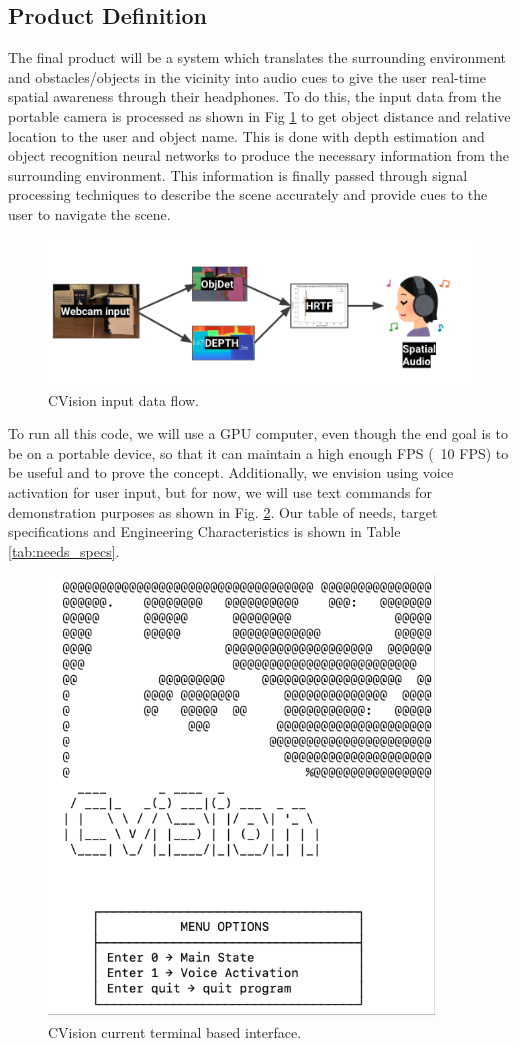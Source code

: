 \documentclass[12pt,a4paper]{article}
\begin{document}
\subsection{Product Definition}
The final product will be a system which translates the surrounding environment and obstacles/objects in the vicinity into audio cues to give the user real-time spatial awareness through their headphones.
To do this, the input data from the portable camera is processed as shown in Fig \ref{data_flow} to get object distance and relative location to the user and object name.
This is done with depth estimation and object recognition neural networks to produce the necessary information from the surrounding environment.
This information is finally passed through signal processing techniques to describe the scene accurately and provide cues to the user to navigate the scene. 

\begin{figure}[ht!]
    \center
    \includegraphics[width=1\linewidth]{data_flow.png}
    \caption{CVision input data flow.}
    \label{data_flow}
  \end{figure}
\newpage
To run all this code, we will use a GPU computer, even though the end goal is to be on a portable device, so that it can maintain a high enough FPS (~10 FPS) to be useful and to prove the concept.
Additionally, we envision using voice activation for user input, but for now, we will use text commands for demonstration purposes as shown in Fig. \ref{gui}.
Our table of needs, target specifications and Engineering Characteristics is shown in Table \ref{tab:needs_specs}.

\begin{figure}[ht!]
    \center
    \includegraphics[width=0.43\linewidth]{gui.png}
    \caption{CVision current terminal based interface.}
    \label{gui}
  \end{figure}
\end{document}
